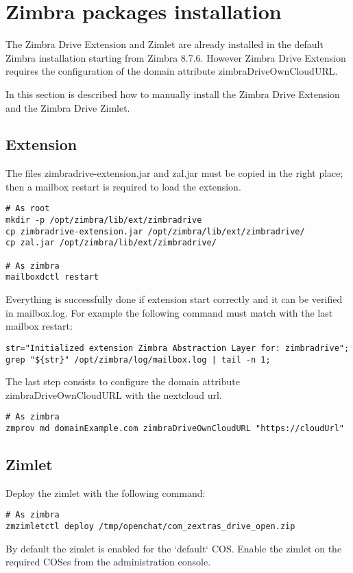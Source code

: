 \section{Zimbra packages installation}

\begin{warning}
The Zimbra Drive Extension and Zimlet are already installed in the default Zimbra installation
starting from Zimbra 8.7.6. However Zimbra Drive Extension requires the configuration of the domain attribute zimbraDriveOwnCloudURL.
\end{warning}
In this section is described how to manually install the Zimbra Drive Extension and the Zimbra Drive Zimlet.
\subsection{Extension}
    The files zimbradrive-extension.jar and zal.jar must be copied in the right place;
    then a mailbox restart is required to load the extension.
    \begin{verbatim}
# As root
mkdir -p /opt/zimbra/lib/ext/zimbradrive
cp zimbradrive-extension.jar /opt/zimbra/lib/ext/zimbradrive/
cp zal.jar /opt/zimbra/lib/ext/zimbradrive/

# As zimbra
mailboxdctl restart
    \end{verbatim}
    Everything is successfully done if extension start correctly and it can be verified in mailbox.log.
    For example the following command must match with the last mailbox restart:
    \begin{verbatim}
str="Initialized extension Zimbra Abstraction Layer for: zimbradrive";
grep "${str}" /opt/zimbra/log/mailbox.log | tail -n 1;
    \end{verbatim}

    The last step consists to configure the domain attribute zimbraDriveOwnCloudURL with the nextcloud url.
    
    \begin{verbatim}
# As zimbra
zmprov md domainExample.com zimbraDriveOwnCloudURL "https://cloudUrl"
    \end{verbatim}

\subsection{Zimlet}
    Deploy the zimlet with the following command:
    \begin{verbatim}
# As zimbra
zmzimletctl deploy /tmp/openchat/com_zextras_drive_open.zip
    \end{verbatim}
    By default the zimlet is enabled for the `default` COS.
    Enable the zimlet on the required COSes from the administration console.

    